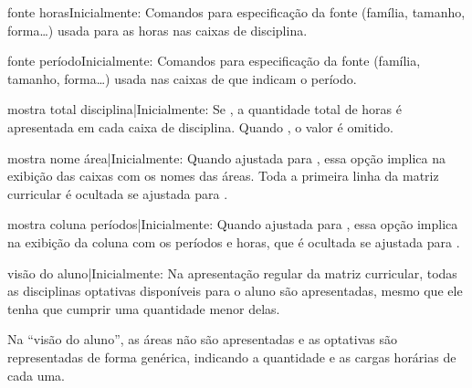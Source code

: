 \documentclass[a4paper, 11pt]{article}
\begin{document}
\begin{Optiondef}{fonte horas}{}{Inicialmente: \PDInline{\sffamily\bfseries\small}}
    Comandos para especificação da fonte (família, tamanho, forma\ldots) usada para as horas nas caixas de disciplina.
\end{Optiondef}

\begin{Optiondef}{fonte período}{}{Inicialmente: \PDInline{\sffamily\bfseries\LARGE}}
    Comandos para especificação da fonte (família, tamanho, forma\ldots) usada nas caixas de que indicam o período.
\end{Optiondef}

\begin{Optiondef}{mostra total disciplina}{|}{Inicialmente: }
    Se , a quantidade total de horas é apresentada em cada caixa de disciplina. Quando , o valor é omitido.
\end{Optiondef}

\begin{Optiondef}{mostra nome área}{|}{Inicialmente: }
    Quando ajustada para , essa opção implica na exibição das caixas com os nomes das áreas. Toda a primeira linha da matriz curricular é ocultada se ajustada para .
\end{Optiondef}

\begin{Optiondef}{mostra coluna períodos}{|}{Inicialmente: }
    Quando ajustada para , essa opção implica na exibição da coluna com os períodos e horas, que é ocultada se ajustada para .
\end{Optiondef}

\begin{Optiondef}{visão do aluno}{|}{Inicialmente: }
    Na apresentação regular da matriz curricular, todas as disciplinas optativas disponíveis para o aluno são apresentadas, mesmo que ele tenha que cumprir uma quantidade menor delas.

    Na ``visão do aluno'', as áreas não são apresentadas e as optativas são representadas de forma genérica, indicando a quantidade e as cargas horárias de cada uma.
\end{Optiondef}


\end{document}
